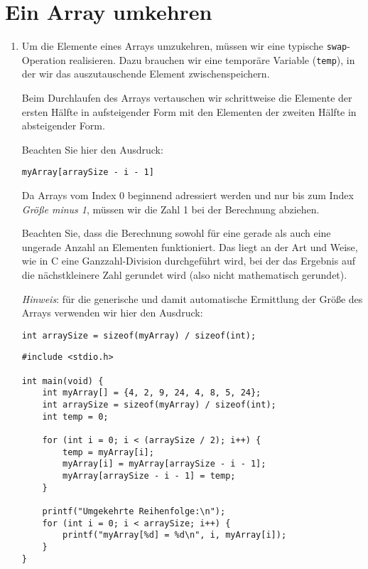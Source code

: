 \chapter{Ein Array umkehren}

\begin{enumerate}
    \item Um die Elemente eines Arrays umzukehren, müssen wir eine typische
    \texttt{swap}-Operation realisieren. Dazu brauchen wir eine
    temporäre Variable (\texttt{temp}), in der wir das auszutauschende
    Element zwischenspeichern.

    Beim Durchlaufen des Arrays vertauschen wir schrittweise die Elemente der
    ersten Hälfte in aufsteigender Form mit den Elementen der zweiten Hälfte in
    absteigender Form.

    Beachten Sie hier den Ausdruck:

    \noindent\texttt{myArray[arraySize - i - 1]}

    Da Arrays vom Index 0 beginnend adressiert werden und nur bis zum Index
    \textit{Größe minus 1}, müssen wir die Zahl 1 bei der Berechnung abziehen.

    Beachten Sie, dass die Berechnung sowohl für eine gerade als auch eine
    ungerade Anzahl an Elementen funktioniert. Das liegt an der Art und Weise,
    wie in C eine Ganzzahl-Division durchgeführt wird, bei der das Ergebnis auf
    die nächstkleinere Zahl gerundet wird (also nicht mathematisch gerundet).

    \textit{Hinweis}: für die generische und damit automatische Ermittlung der
    Größe des Arrays verwenden wir hier den Ausdruck:

    \noindent\texttt{int arraySize = sizeof(myArray) / sizeof(int);}

\begin{verbatim}
#include <stdio.h>

int main(void) {
    int myArray[] = {4, 2, 9, 24, 4, 8, 5, 24};
    int arraySize = sizeof(myArray) / sizeof(int);
    int temp = 0;

    for (int i = 0; i < (arraySize / 2); i++) {
        temp = myArray[i];
        myArray[i] = myArray[arraySize - i - 1];
        myArray[arraySize - i - 1] = temp;
    }

    printf("Umgekehrte Reihenfolge:\n");
    for (int i = 0; i < arraySize; i++) {
        printf("myArray[%d] = %d\n", i, myArray[i]);
    }
}
\end{verbatim}


\end{enumerate}
